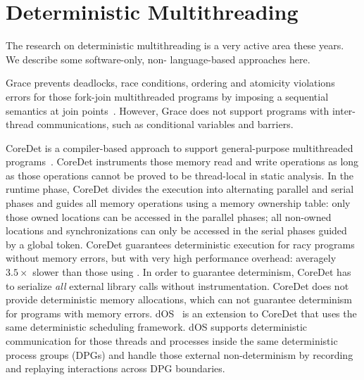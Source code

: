 \section{Deterministic Multithreading}
The research on deterministic multithreading is a very active area these years. We describe some software-only, non- language-based approaches here.

Grace prevents deadlocks, race conditions, ordering and atomicity violations errors for those fork-join multithreaded programs by imposing a sequential semantics at join points~\cite{grace}. However, Grace does not support programs with inter-thread communications, such as conditional variables and barriers.

CoreDet is a compiler-based approach to 
support general-purpose multithreaded programs~\cite{Bergan:2010:CCR:1736020.1736029}. 
CoreDet instruments those memory read and write operations as long
as those operations cannot be proved to be thread-local in static analysis. 
In the runtime phase, CoreDet divides the execution into 
alternating parallel and serial phases and guides all memory operations 
using a memory ownership table: only those owned locations can be accessed
in the parallel phases; all non-owned locations and synchronizations can only 
be accessed in the serial phases guided by a global token.
CoreDet guarantees deterministic execution for racy programs without memory errors,
but with very high performance overhead: 
averagely $3.5\times$ slower than those using \pthreads{}.
In order to guarantee determinism, 
CoreDet has to serialize \emph{all} external library calls without instrumentation.
CoreDet does not provide deterministic 
memory allocations, which can not guarantee determinism for programs with memory errors.  
dOS~\cite{deterministic-process-groups} is an extension to CoreDet that uses the same deterministic scheduling framework.  dOS supports deterministic communication for those threads and processes inside the same
deterministic process groups (DPGs) and handle those external non-determinism by recording and
replaying interactions across DPG boundaries. 

